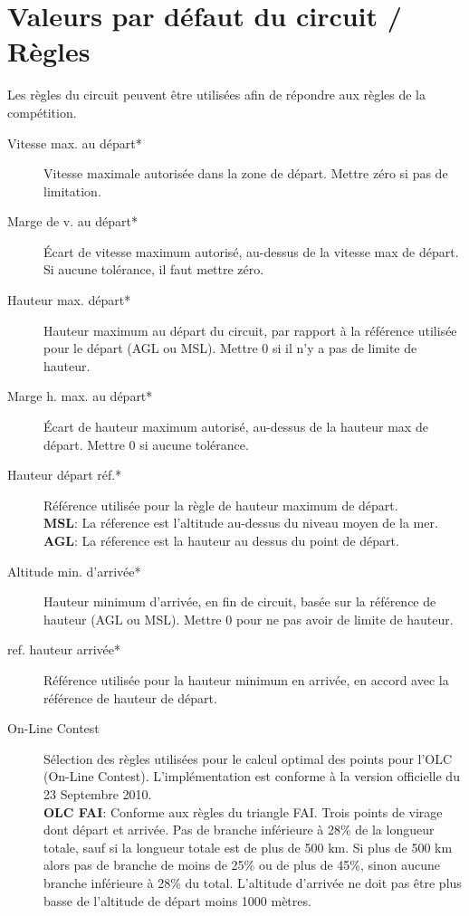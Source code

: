 \section{Valeurs par défaut du circuit / Règles}

Les règles du circuit peuvent être utilisées afin de répondre aux règles de la compétition. \label{conf:taskrules}

\begin{description}
\item[Vitesse max. au départ*]  Vitesse maximale autorisée dans la zone de départ. Mettre zéro si pas de limitation.
\item[Marge de v. au départ*] Écart de vitesse maximum autorisé, au-dessus de la vitesse max de départ. Si aucune tolérance, il faut mettre zéro.
\item[Hauteur max. départ*]  Hauteur maximum au départ du circuit, par rapport à la référence utilisée pour le départ (AGL ou MSL). Mettre 0 si il n'y a pas de limite de hauteur.
\item[Marge h. max. au départ*]  Écart de hauteur maximum autorisé, au-dessus de la hauteur max de départ. Mettre 0 si aucune tolérance.
\item[Hauteur départ réf.*]  Référence utilisée pour la règle de hauteur maximum de départ. \\
  {\bf MSL}: La réference est l'altitude au-dessus du niveau moyen de la mer. \\
  {\bf AGL}: La réference est la hauteur au dessus du point de départ.
\item[Altitude min. d'arrivée*]  Hauteur minimum d'arrivée, en fin de circuit, basée sur la référence de hauteur (AGL ou MSL). Mettre 0 pour ne pas avoir de limite de hauteur. 
\item[ref. hauteur arrivée*]  Référence utilisée pour la hauteur minimum en arrivée, en accord avec la référence de hauteur de départ.
\item[On-Line Contest] Sélection des règles utilisées pour le calcul optimal des points pour l'OLC (On-Line Contest). L'implémentation est conforme à la version officielle du 23 Septembre 2010. \\
  {\bf OLC FAI}: Conforme aux règles du triangle FAI. Trois points de virage dont départ et arrivée. Pas de branche inférieure à 28\% de la longueur totale, sauf si la longueur totale est de plus de 500 km. Si plus de 500 km alors pas de branche de moins de 25\% ou de plus de 45\%, sinon aucune branche inférieure à 28\% du total. L'altitude d'arrivée ne doit pas être plus basse de l'altitude de départ moins 1000 mètres. \\

\end{description}
